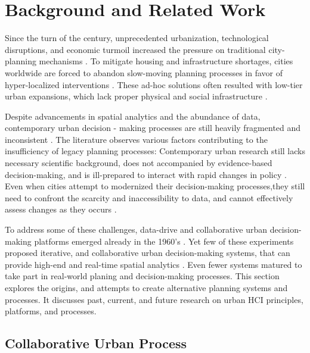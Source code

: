 \section{Background and Related Work}

{Since the turn of the century, unprecedented urbanization, technological disruptions, and economic turmoil increased the pressure on traditional city-planning mechanisms \cite{parnell2016defining, UnitedNationsHabitatIII2017}. To mitigate housing and infrastructure shortages, cities worldwide are forced to abandon slow-moving planning processes in favor of hyper-localized interventions \cite{banerjee2011companion}. These ad-hoc solutions often resulted with low-tier urban expansions, which lack proper physical and social infrastructure \cite{Glaeser2011, MARCHETTI199475}.}

{Despite advancements in spatial analytics and the abundance of data, contemporary urban decision - making processes are still heavily fragmented and inconsistent \cite{branch1978critical, banerjee2011companion, Ben-Joseph2004}. The literature observes various factors contributing to the insufficiency of legacy planning processes: Contemporary urban research still lacks necessary scientific background, does not accompanied by evidence-based decision-making, and is ill-prepared to interact with rapid changes in policy \cite{banerjee2011companion, McPhearson2016}. Even when cities attempt to modernized their decision-making processes,they still need to confront the scarcity and inaccessibility to data, and cannot effectively assess changes as they occurs \cite{bulmer_how_2001}.}

{To address some of these challenges, data-drive and collaborative urban decision-making platforms emerged already in the 1960's \cite{Ben-Joseph2001, Ishii2002, banerjee2011companion}. Yet few of these experiments proposed iterative, and collaborative urban decision-making systems, that can provide high-end and real-time spatial analytics \cite{Snyder2003, mueller2018citizen}. Even fewer systems matured to take part in real-world planing and decision-making processes. This section explores the origins, and attempts to create alternative planning systems and processes. It discusses past, current, and future research on urban HCI principles, platforms, and processes.}

\subsection{Collaborative Urban Process}

